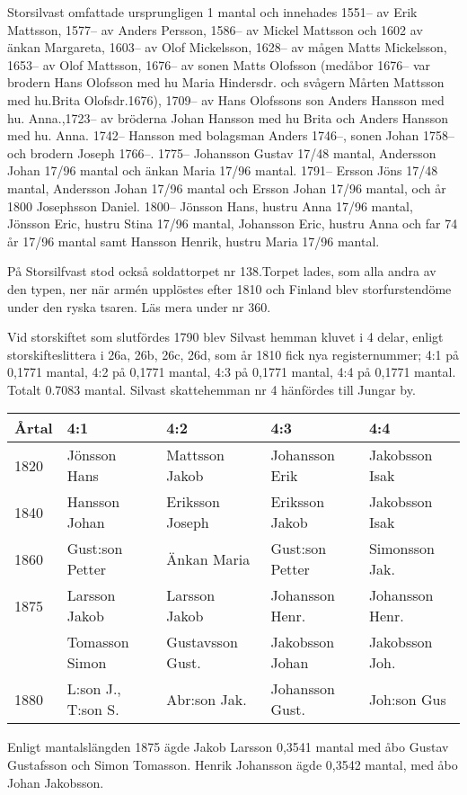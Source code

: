 Storsilvast omfattade ursprungligen 1 mantal och innehades 1551-- av Erik Mattsson, 1577-- av Anders Persson, 1586-- av Mickel Mattsson och 1602 av änkan Margareta, 1603-- av Olof Mickelsson, 1628-- av mågen Matts Mickelsson, 1653-- av Olof Mattsson, 1676-- av sonen Matts Olofsson (medåbor 1676-- var brodern Hans Olofsson med hu Maria Hindersdr. och svågern Mårten Mattsson med hu.Brita Olofsdr.1676), 1709-- av Hans Olofssons son Anders Hansson med hu. Anna.,1723-- av bröderna Johan Hansson med hu Brita och Anders Hansson med hu. Anna.  1742-- Hansson med bolagsman Anders 1746--, sonen Johan	1758-- och brodern Joseph 1766--. 1775--	Johansson Gustav 17/48 mantal, Andersson Johan 17/96 mantal och 	änkan Maria 17/96 mantal.	1791-- 	Ersson Jöns 17/48 mantal, Andersson Johan 17/96 mantal och Ersson Johan 17/96 mantal, och år 1800 Josephsson	Daniel.	1800--	Jönsson Hans, hustru Anna 17/96 mantal, Jönsson Eric,	hustru Stina 17/96 mantal, Johansson Eric, hustru Anna och	far 74 år 17/96 mantal samt Hansson Henrik, hustru Maria 17/96 mantal.

På Storsilfvast stod också soldattorpet nr 138.Torpet lades, som alla andra av den typen, ner när armén upplöstes efter 1810 och Finland blev storfurstendöme under den ryska tsaren. Läs mera under nr 360.


Vid storskiftet som slutfördes 1790 blev Silvast hemman kluvet i 4 delar, enligt storskifteslittera i 26a, 26b, 26c, 26d, som år 1810 fick nya registernummer;	4:1 på 0,1771 mantal,	4:2 på 0,1771 mantal, 4:3 på 0,1771 mantal,	4:4 på 0,1771 mantal. Totalt 0.7083 mantal. Silvast skattehemman nr 4 hänfördes till Jungar by.


\begin{center}
  \begin{tabular}{l l l l l}
    Årtal & 4:1 & 4:2 & 4:3 & 4:4 \\ \hline
    1820& Jönsson Hans & Mattsson Jakob & Johansson Erik & Jakobsson Isak \\
    1840& Hansson Johan & Eriksson Joseph & Eriksson Jakob & Jakobsson Isak \\
    1860& Gust:son Petter & Änkan Maria &	Gust:son Petter & Simonsson Jak. \\
    1875& Larsson Jakob & Larsson Jakob & Johansson Henr. & Johansson Henr. \\
        & Tomasson Simon & Gustavsson Gust. & Jakobsson Johan & Jakobsson Joh. \\
    1880& L:son J., T:son S. & Abr:son Jak. & Johansson Gust. & Joh:son Gus \\ \hline
  \end{tabular}
\end{center}
Enligt mantalslängden 1875 ägde Jakob Larsson 0,3541 mantal med åbo	Gustav Gustafsson och Simon Tomasson. Henrik Johansson ägde 0,3542 	mantal, med åbo Johan Jakobsson.

